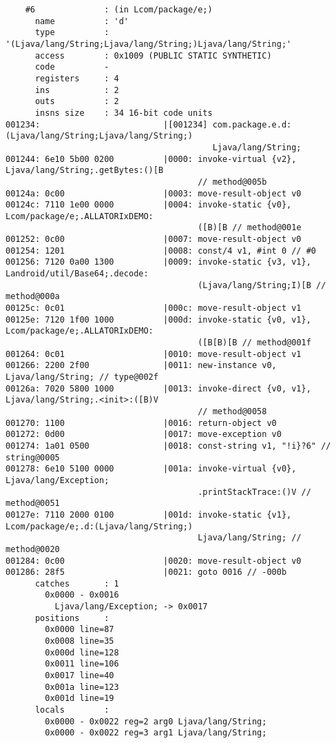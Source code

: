\begin{lstlisting}
    #6              : (in Lcom/package/e;)
      name          : 'd'
      type          : '(Ljava/lang/String;Ljava/lang/String;)Ljava/lang/String;'
      access        : 0x1009 (PUBLIC STATIC SYNTHETIC)
      code          -
      registers     : 4
      ins           : 2
      outs          : 2
      insns size    : 34 16-bit code units
001234:                         |[001234] com.package.e.d:(Ljava/lang/String;Ljava/lang/String;)
                                          Ljava/lang/String;
001244: 6e10 5b00 0200          |0000: invoke-virtual {v2}, Ljava/lang/String;.getBytes:()[B
                                       // method@005b
00124a: 0c00                    |0003: move-result-object v0
00124c: 7110 1e00 0000          |0004: invoke-static {v0}, Lcom/package/e;.ALLATORIxDEMO:
                                       ([B)[B // method@001e
001252: 0c00                    |0007: move-result-object v0
001254: 1201                    |0008: const/4 v1, #int 0 // #0
001256: 7120 0a00 1300          |0009: invoke-static {v3, v1}, Landroid/util/Base64;.decode:
                                       (Ljava/lang/String;I)[B // method@000a
00125c: 0c01                    |000c: move-result-object v1
00125e: 7120 1f00 1000          |000d: invoke-static {v0, v1}, Lcom/package/e;.ALLATORIxDEMO:
                                       ([B[B)[B // method@001f
001264: 0c01                    |0010: move-result-object v1
001266: 2200 2f00               |0011: new-instance v0, Ljava/lang/String; // type@002f
00126a: 7020 5800 1000          |0013: invoke-direct {v0, v1}, Ljava/lang/String;.<init>:([B)V
                                       // method@0058
001270: 1100                    |0016: return-object v0
001272: 0d00                    |0017: move-exception v0
001274: 1a01 0500               |0018: const-string v1, "!i}?6" // string@0005
001278: 6e10 5100 0000          |001a: invoke-virtual {v0}, Ljava/lang/Exception;
                                       .printStackTrace:()V // method@0051
00127e: 7110 2000 0100          |001d: invoke-static {v1}, Lcom/package/e;.d:(Ljava/lang/String;)
                                       Ljava/lang/String; // method@0020
001284: 0c00                    |0020: move-result-object v0
001286: 28f5                    |0021: goto 0016 // -000b
      catches       : 1
        0x0000 - 0x0016
          Ljava/lang/Exception; -> 0x0017
      positions     :
        0x0000 line=87
        0x0008 line=35
        0x000d line=128
        0x0011 line=106
        0x0017 line=40
        0x001a line=123
        0x001d line=19
      locals        :
        0x0000 - 0x0022 reg=2 arg0 Ljava/lang/String;
        0x0000 - 0x0022 reg=3 arg1 Ljava/lang/String;


\end{lstlisting}
